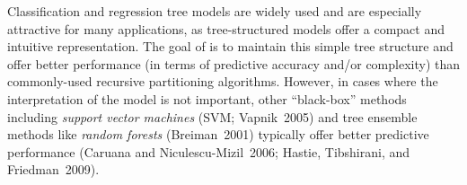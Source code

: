 \documentclass[DIN, pagenumber=false, parskip=half,%
               fromalign=left, fromphone=true,%
               fromemail=true, fromurl=false, %
               fromlogo=true, fromrule=false, fromrule=afteraddress]{scrlttr2}
\begin{document}
Classification and regression tree models are widely used and are especially
attractive for many applications, as tree-structured models offer a compact and
intuitive representation. The goal of  is to maintain this
simple tree structure and offer better performance (in terms of predictive
accuracy and/or complexity) than commonly-used recursive partitioning
algorithms. However, in cases where the interpretation of the model is not
important, other ``black-box'' methods including \textit{support vector machines}
(SVM; Vapnik~2005) and tree ensemble methods like \textit{random
forests} (Breiman~2001) typically offer better predictive performance
(Caruana and Niculescu-Mizil~2006;  Hastie, Tibshirani, and Friedman~2009).
 
\end{document}
